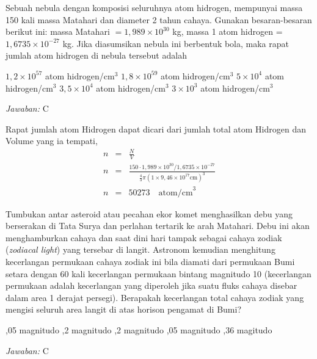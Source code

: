 \documentclass[11pt,fleqn]{exam}
\begin{document}
\begin{questions}
\vspace{0.5cm}
\question Sebuah nebula dengan komposisi seluruhnya atom hidrogen, mempunyai massa 150 kali massa Matahari dan diameter 2 tahun cahaya. Gunakan besaran-besaran berikut ini: massa Matahari $= 1,989 \times 10^{30}$ kg, massa 1 atom hidrogen = $1,6735 \times 10^{-27}$ kg. Jika diasumsikan nebula ini berbentuk bola, maka rapat jumlah atom hidrogen di nebula tersebut adalah
\begin{choices}
\choice $1,2 \times 10^{57}$ atom hidrogen/cm$^3$
\choice $1,8 \times 10^{59}$ atom hidrogen/cm$^3$
\choice $5 \times 10^{4}$  atom hidrogen/cm$^3$
\choice $3,5 \times 10^{4}$ atom hidrogen/cm$^3$
\choice $3 \times 10^{3}$  atom hidrogen/cm$^3$
\end{choices}

\bigskip
\textit{Jawaban: } C

Rapat jumlah atom Hidrogen dapat dicari dari jumlah total atom Hidrogen dan Volume yang ia tempati,
\begin{eqnarray*}
    n &=& \frac{N}{V}\\
    n &=& \frac{150 \cdot 1,989 \times 10^{30} / 1,6735 \times 10^{-27}}{\frac{4}{3} \pi (1 \times 9,46 \times 10^{17} \text{cm})^3}\\
    n &=& 50273 \quad \text{atom/cm}^3
\end{eqnarray*}

\vspace{0.5cm}
\question Tumbukan antar asteroid atau pecahan ekor komet menghasilkan debu yang berserakan di Tata Surya dan perlahan tertarik ke arah Matahari. Debu ini akan menghamburkan cahaya dan saat dini hari tampak sebagai cahaya zodiak (\textit{zodiacal light}) yang tersebar di langit. Astronom kemudian menghitung kecerlangan permukaan cahaya zodiak ini bila diamati dari permukaan Bumi setara dengan 60 kali kecerlangan permukaan bintang magnitudo 10 (kecerlangan permukaan adalah kecerlangan yang diperoleh jika suatu fluks cahaya disebar dalam area 1 derajat persegi). Berapakah kecerlangan total cahaya zodiak yang mengisi seluruh area langit di atas horison pengamat di Bumi?
\begin{choices}
,05 magnitudo
,2 magnitudo
,2 magnitudo
,05 magnitudo
,36 magitudo
\end{choices}

\bigskip
\textit{Jawaban: } C


\end{questions}
\end{document}
